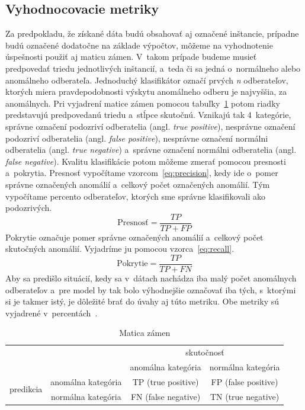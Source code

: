 \documentclass[a4paper,twoside,slovak,12pt,appendix]{article}
\begin{document}
\subsection{Vyhodnocovacie metriky}
\label{c:evaluation-metrics}
Za predpokladu, že získané dáta budú obsahovať aj označené inštancie, prípadne
budú označené dodatočne na základe výpočtov, môžeme na vyhodnotenie úspešnosti
použiť aj maticu zámen. V~takom prípade budeme musieť predpovedať triedu
jednotlivých inštancií, a~teda či sa jedná o~normálneho alebo anomálneho
odberateľa. Jednoduchý klasifikátor označí prvých \textit{n} odberateľov,
ktorých miera pravdepodobnosti výskytu anomálneho odberu je najvyššia, za
anomálnych. Pri vyjadrení matice zámen pomocou
tabuľky~\ref{tab:confusion-matrix} potom riadky predstavujú predpovedanú triedu
a~stĺpce skutočnú. Vznikajú tak 4~kategórie, správne označení podozriví
odberatelia (angl. \textit{true positive}), nesprávne označení podozriví
odberatelia (angl. \textit{false positive}), nesprávne označení normálni
odberatelia (angl. \textit{true negative}) a~správne označení normálni
odberatelia (angl. \textit{false negative}). Kvalitu klasifikácie potom môžeme
zmerať pomocou presnosti a~pokrytia. Presnosť vypočítame
vzorcom~\ref{eq:precision}, kedy ide o~pomer správne označených anomálií
a~celkový počet označených anomálií. Tým vypočítame percento odberateľov,
ktorých sme správne klasifikovali ako podozrivých.
\begin{equation}
	\label{eq:precision}
  \text{Presnosť} = \frac{TP}{TP + FP}
\end{equation}
Pokrytie označuje pomer správne označených anomálií a~celkový počet skutočných
anomálií. Vyjadríme ju pomocou vzorca~\ref{eq:recall}.
\begin{equation}
	\label{eq:recall}
  \text{Pokrytie} = \frac{TP}{TP + FN}
\end{equation}
Aby sa predišlo situácií, kedy sa v~dátach nachádza iba malý počet anomálnych
odberateľov a~pre model by tak bolo výhodnejšie označovať iba tých, s~ktorými si
je takmer istý, je dôležité brať do úvahy aj túto metriku. Obe metriky sú
vyjadrené v~percentách~\cite{Trevizan2015,Wei2006}.

\begin{table}[htbp]
	\centering
	\caption{Matica zámen}
	\label{tab:confusion-matrix}
	\begin{tabular}{|c|c|c|c|}
		\hline
		\multicolumn{2}{|c|}{\multirow{2}{*}{}} 									 & \multicolumn{2}{c|}{skutočnosť} 							 \\ \cline{3-4}
		\multicolumn{2}{|c|}{}       									      			 &  anomálna kategória   &  normálna kategória   \\ \hline
		\multirow{2}{*}[1.2pt]{predikcia}   &  anomálna kategória  &  TP (true positive)   &  FP (false positive)  \\ \cline{2-4}
																				&  normálna kategória  &  FN (false negative)  &  TN (true negative)   \\ \hline
	\end{tabular}
\end{table}
\end{document}
